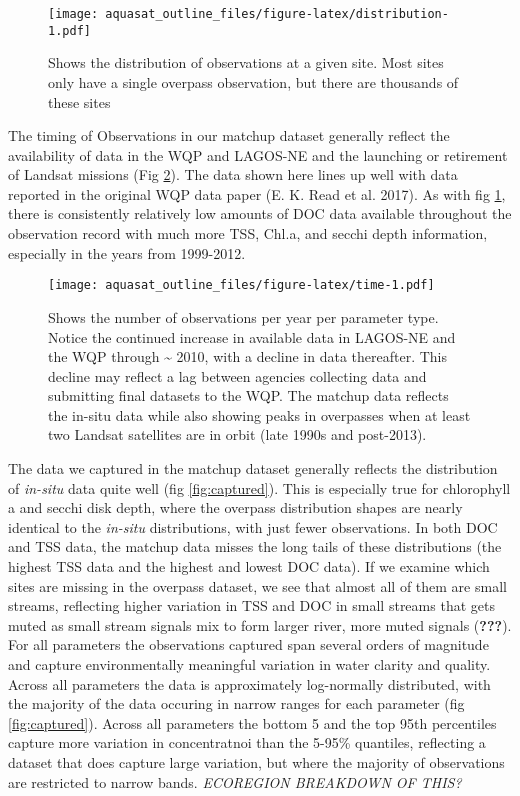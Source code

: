 \documentclass[]{article}
\begin{document}
\begin{figure}
\centering
\texttt{[image: aquasat\_outline\_files/figure-latex/distribution-1.pdf]}
\caption{\label{fig:distribution} Shows the distribution of observations
at a given site. Most sites only have a single overpass observation, but
there are thousands of these sites}
\end{figure}

The timing of Observations in our matchup dataset generally reflect the
availability of data in the WQP and LAGOS-NE and the launching or
retirement of Landsat missions (Fig \ref{fig:time}). The data shown here
lines up well with data reported in the original WQP data paper (E. K.
Read et al. 2017). As with fig \ref{fig:distribution}, there is
consistently relatively low amounts of DOC data available throughout the
observation record with much more TSS, Chl.a, and secchi depth
information, especially in the years from 1999-2012.

\begin{figure}
\centering
\texttt{[image: aquasat\_outline\_files/figure-latex/time-1.pdf]}
\caption{\label{fig:time} Shows the number of observations per year per
parameter type. Notice the continued increase in available data in
LAGOS-NE and the WQP through \textasciitilde{} 2010, with a decline in
data thereafter. This decline may reflect a lag between agencies
collecting data and submitting final datasets to the WQP. The matchup
data reflects the in-situ data while also showing peaks in overpasses
when at least two Landsat satellites are in orbit (late 1990s and
post-2013).}
\end{figure}

The data we captured in the matchup dataset generally reflects the
distribution of \emph{in-situ} data quite well (fig \ref{fig:captured}).
This is especially true for chlorophyll a and secchi disk depth, where
the overpass distribution shapes are nearly identical to the
\emph{in-situ} distributions, with just fewer observations. In both DOC
and TSS data, the matchup data misses the long tails of these
distributions (the highest TSS data and the highest and lowest DOC
data). If we examine which sites are missing in the overpass dataset, we
see that almost all of them are small streams, reflecting higher
variation in TSS and DOC in small streams that gets muted as small
stream signals mix to form larger river, more muted signals
({\textbf{???}}). For all parameters the observations captured span
several orders of magnitude and capture environmentally meaningful
variation in water clarity and quality. Across all parameters the data
is approximately log-normally distributed, with the majority of the data
occuring in narrow ranges for each parameter (fig \ref{fig:captured}).
Across all parameters the bottom 5 and the top 95th percentiles capture
more variation in concentratnoi than the 5-95\% quantiles, reflecting a
dataset that does capture large variation, but where the majority of
observations are restricted to narrow bands. \emph{ECOREGION BREAKDOWN
OF THIS?}
\end{document}
